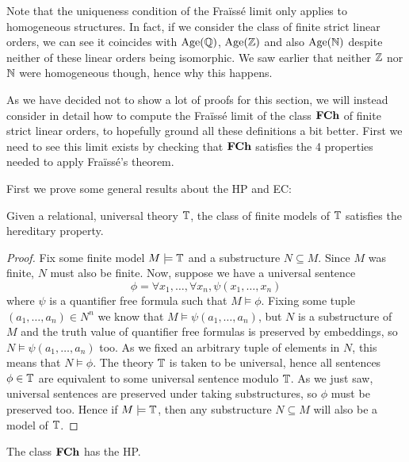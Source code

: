 Note that the uniqueness condition of the Fraïssé limit only applies to homogeneous
structures. In fact, if we consider the class of finite strict linear orders, we can see it
coincides with $\operatorname{Age}(\mathbb{Q})$, $\operatorname{Age}(\mathbb{Z})$ and also $\operatorname{Age}(\mathbb{N})$ despite neither of these linear orders
being isomorphic. We saw earlier that neither $\mathbb{Z}$ nor $\mathbb{N}$ were homogeneous though, hence why this
happens.

As we have decided not to show a lot of proofs for this section, we will instead consider in
detail how to compute the Fraïssé limit of the class $\textbf{FCh}$ of finite strict linear orders,
to hopefully ground all these definitions a bit better. First we need to see this limit exists
by checking that $\textbf{FCh}$ satisfies the 4 properties needed to apply Fraïssé's theorem.

First we prove some general results about the HP and EC:

\begin{prop}
  Given a relational, universal theory $\mathbb{T}$, the class of finite models of $\mathbb{T}$ satisfies
  the hereditary property.
\end{prop}
\begin{proof}
  Fix some finite model $M \models \mathbb{T}$ and a substructure
  $N \subseteq M$. Since $M$ was finite, $N$ must also be finite. Now, suppose we have a universal
  sentence
  \begin{equation*}
    \phi = \forall x_1, \dots, \forall x_n, \psi(x_1,\dots,x_n)
  \end{equation*}
  where $\psi$ is a quantifier free formula such that $M \models \phi$. Fixing some tuple $(a_1,\dots,a_n) \in N^n$ we
  know that $M \models \psi(a_1,\dots,a_n)$, but $N$ is a substructure of $M$ and the truth value
  of quantifier free formulas is preserved by embeddings, so $N \models \psi(a_1,\dots,a_n)$ too.
  As we fixed an arbitrary tuple of elements in $N$, this means that $N \models \phi$.
  The theory $\mathbb{T}$ is taken to be universal, hence all sentences $\phi \in \mathbb{T}$ are
  equivalent to some universal sentence modulo $\mathbb{T}$. As we just saw, universal sentences
  are preserved under taking substructures, so $\phi$ must be preserved too.
  Hence if $M \models \mathbb{T}$, then any substructure
  $N \subseteq M$ will also be a model of $\mathbb{T}$.
\end{proof}

\begin{cor}
  The class $\textbf{FCh}$ has the HP.
\end{cor}

